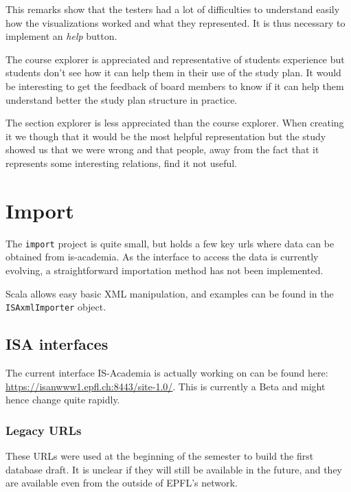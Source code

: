 This remarks show that the testers had a lot of difficulties to understand easily how the visualizations worked and what they represented. It is thus necessary to implement an \emph{help} button. 

The course explorer is appreciated and representative of students experience but students don't see how it can help them in their use of the study plan. It would be interesting to get the feedback of board members to know if it can help them understand better the study plan structure in practice.

The section explorer is less appreciated than the course explorer. When creating it we though that it would be the most helpful representation but the study showed us that we were wrong and that people, away from the fact that it represents some interesting relations, find it not useful. 

\chapter{Import}
The \verb|import| project is quite small, but holds a few key urls where data can be obtained from is-academia. As the interface to access the data is currently evolving, a straightforward importation method has not been implemented.

Scala allows easy basic XML manipulation, and examples can be found in the \verb|ISAxmlImporter| object.

\section{ISA interfaces}
The current interface IS-Academia is actually working on can be found here: \url{https://isanwww1.epfl.ch:8443/site-1.0/}. This is currently a Beta and might hence change quite rapidly.

\subsection{Legacy URLs}
These URLs were used at the beginning of the semester to build the first database draft. It is unclear if they will still be available in the future, and they are available even from the outside of EPFL's network.

